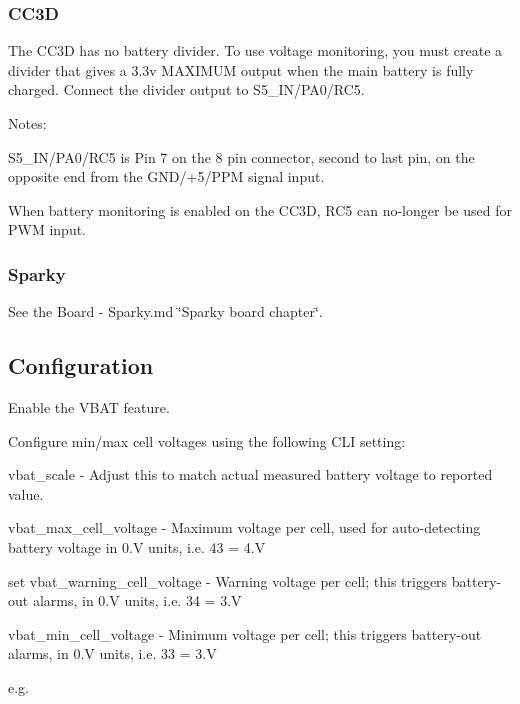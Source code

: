 \subsubsection*{C\+C3\+D}

The C\+C3\+D has no battery divider. To use voltage monitoring, you must create a divider that gives a 3.\+3v M\+A\+X\+I\+M\+U\+M output when the main battery is fully charged. Connect the divider output to S5\+\_\+\+I\+N/\+P\+A0/\+R\+C5.

Notes\+:


\begin{DoxyItemize}
\item S5\+\_\+\+I\+N/\+P\+A0/\+R\+C5 is Pin 7 on the 8 pin connector, second to last pin, on the opposite end from the G\+N\+D/+5/\+P\+P\+M signal input.
\item When battery monitoring is enabled on the C\+C3\+D, R\+C5 can no-\/longer be used for P\+W\+M input.
\end{DoxyItemize}

\subsubsection*{Sparky}

See the Board -\/ Sparky.\+md \char`\"{}\+Sparky board chapter\char`\"{}.

\subsection*{Configuration}

Enable the {\ttfamily V\+B\+A\+T} feature.

Configure min/max cell voltages using the following C\+L\+I setting\+:

{\ttfamily vbat\+\_\+scale} -\/ Adjust this to match actual measured battery voltage to reported value.

{\ttfamily vbat\+\_\+max\+\_\+cell\+\_\+voltage} -\/ Maximum voltage per cell, used for auto-\/detecting battery voltage in 0.\+V units, i.\+e. 43 = 4.\+V

{\ttfamily set vbat\+\_\+warning\+\_\+cell\+\_\+voltage} -\/ Warning voltage per cell; this triggers battery-\/out alarms, in 0.\+V units, i.\+e. 34 = 3.\+V

{\ttfamily vbat\+\_\+min\+\_\+cell\+\_\+voltage} -\/ Minimum voltage per cell; this triggers battery-\/out alarms, in 0.\+V units, i.\+e. 33 = 3.\+V

e.\+g.

